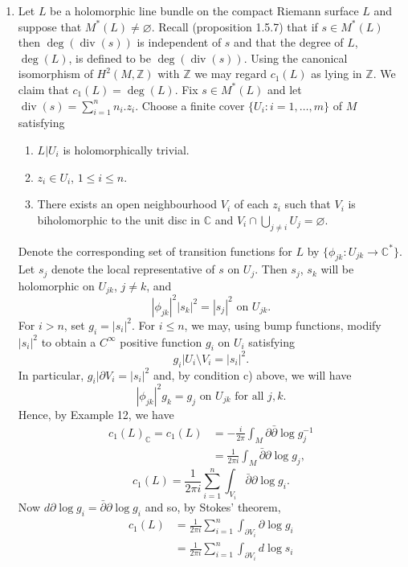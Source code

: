 \begin{enumerate}[start=10]
\item Let $L$ be a holomorphic line bundle on the compact Riemann surface $L$ and suppose that $M^*(L)\neq\varnothing$. Recall (proposition 1.5.7) that if $s\in M^*(L)$ then $\deg(\operatorname{div}(s))$ is independent of $s$ and that the degree of $L$, $\deg(L)$, is defined to be $\deg(\operatorname{div}(s))$. Using the canonical isomorphism of $H^2(M,\mathbb Z)$ with $\mathbb Z$ we may regard $c_1(L)$ as lying in $\mathbb Z$. We claim that $c_1(L)=\deg(L)$. Fix $s\in M^*(L)$ and let
$\operatorname{div}(s)=\sum_{i=1}^n n_i.z_i$. Choose a finite cover $\{U_i:i=1,\ldots,m\}$ of $M$ satisfying
\begin{enumerate}[label=\alph*)]
\item $L|U_i$ is holomorphically trivial.
\item $z_i\in U_i$, $1\leq i\leq n$.
\item There exists an open neighbourhood $V_i$ of each $z_i$ such that $V_i$ is biholomorphic to the unit disc in $\mathbb C$ and $V_i\cap\bigcup_{j\neq i}U_j=\varnothing$.
\end{enumerate}
Denote the corresponding set of transition functions for $L$ by $\{\phi_{jk}:U_{jk}\to\mathbb C^*\}$. Let $s_j$ denote the local representative of $s$ on $U_j$. Then $s_j$, $s_k$ will be holomorphic on $U_{jk}$, $j\neq k$, and
\[
|\phi_{jk}|^2|s_k|^2=|s_j|^2\text{ on }U_{jk}.
\]
For $i>n$, set $g_i=|s_i|^2$. For $i\leq n$, we may, using bump functions, modify $|s_i|^2$ to obtain a $C^\infty$ positive function $g_i$ on $U_i$ satisfying
\[
g_i|U_i\setminus V_i=|s_i|^2.
\]
In particular, $g_i|\partial V_i=|s_i|^2$ and, by condition c) above, we will have
\[
|\phi_{jk}|^2g_k=g_j\text{ on }U_{jk}\text{ for all }j,k.
\]
Hence, by Example 12, we have
\[
\begin{aligned}
c_1(L)_{\mathbb C}=c_1(L)&=-\frac i{2\pi}\int_M\partial\bar\partial\log g_j^{-1}\\
&=\frac1{2\pi i}\int_M\bar\partial\partial\log g_j,
\end{aligned}
\]
\[
c_1(L)=\frac1{2\pi i}\sum_{i=1}^n\int_{V_i}\bar\partial\partial\log g_i.
\]
Now $d\partial\log g_i=\bar\partial\partial\log g_i$ and so, by Stokes' theorem,
\[
\begin{aligned}
c_1(L)&=\frac1{2\pi i}\sum_{i=1}^n\int_{\partial V_i}\partial\log g_i\\
&=\frac1{2\pi i}\sum_{i=1}^n\int_{\partial V_i}d\log s_i

\end{aligned}\]
\end{enumerate}
